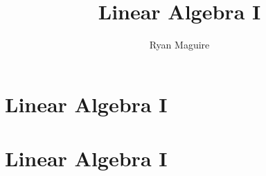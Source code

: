 \documentclass[crop=false,class=book,oneside]{standalone}
\begin{document}
    \ifx\ifmathcourses\undefined
        \title{Linear Algebra I}
        \author{Ryan Maguire}
        \date{\vspace{-5ex}}
        \maketitle
        \tableofcontents
        \chapter*{Linear Algebra I}
        \setcounter{chapter}{1}
    \else
        \chapter{Linear Algebra I}
    \fi
\end{document}
